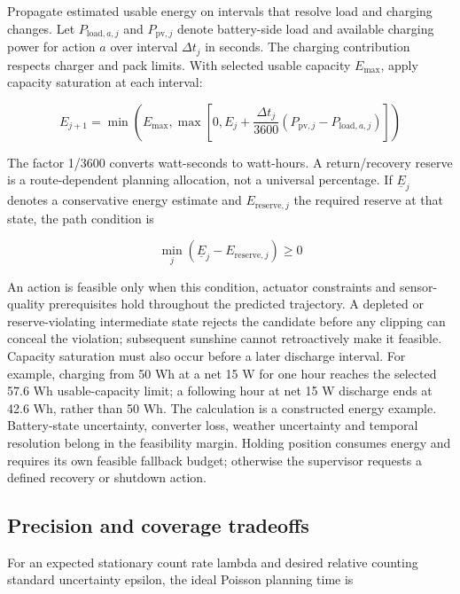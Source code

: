 \documentclass[11pt,letterpaper]{article}
\begin{document}
Propagate estimated usable energy on intervals that resolve load and charging changes. Let \(P_{\mathrm{load},a,j}\) and \(P_{\mathrm{pv},j}\) denote battery-side load and available charging power for action \(a\) over interval \(\Delta t_j\) in seconds. The charging contribution respects charger and pack limits. With selected usable capacity \(E_{\max}\), apply capacity saturation at each interval:

\begin{equation}
E_{j+1}=\min\!\left(E_{\max},\max\!\left[0,E_j+\frac{\Delta t_j}{3600}\left(P_{\mathrm{pv},j}-P_{\mathrm{load},a,j}\right)\right]\right)
\label{eq:16}
\end{equation}

The factor 1/3600 converts watt-seconds to watt-hours. A return/recovery reserve is a route-dependent planning allocation, not a universal percentage. If \(\underline E_j\) denotes a conservative energy estimate and \(E_{\mathrm{reserve},j}\) the required reserve at that state, the path condition is

\begin{equation}
\min_j\left(\underline E_j-E_{\mathrm{reserve},j}\right)\geq0
\label{eq:17}
\end{equation}

An action is feasible only when this condition, actuator constraints and sensor-quality prerequisites hold throughout the predicted trajectory. A depleted or reserve-violating intermediate state rejects the candidate before any clipping can conceal the violation; subsequent sunshine cannot retroactively make it feasible. Capacity saturation must also occur before a later discharge interval. For example, charging from 50 Wh at a net 15 W for one hour reaches the selected 57.6 Wh usable-capacity limit; a following hour at net 15 W discharge ends at 42.6 Wh, rather than 50 Wh. The calculation is a constructed energy example. Battery-state uncertainty, converter loss, weather uncertainty and temporal resolution belong in the feasibility margin. Holding position consumes energy and requires its own feasible fallback budget; otherwise the supervisor requests a defined recovery or shutdown action.

\subsection{Precision and coverage tradeoffs}

For an expected stationary count rate lambda and desired relative counting standard uncertainty epsilon, the ideal Poisson planning time is
\end{document}
